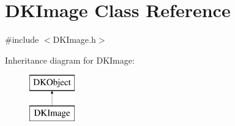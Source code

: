 \hypertarget{class_d_k_image}{\section{D\-K\-Image Class Reference}
\label{class_d_k_image}
}


{\ttfamily \#include $<$D\-K\-Image.\-h$>$}

Inheritance diagram for D\-K\-Image\-:\begin{figure}[H]
\begin{center}
\leavevmode
\includegraphics[height=2.000000cm]{class_d_k_image}
\end{center}
\end{figure}
